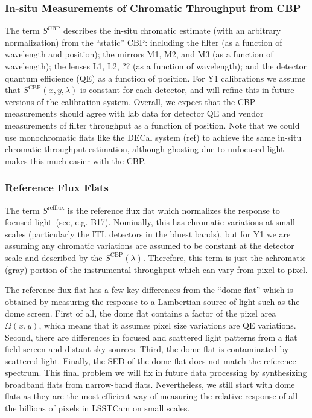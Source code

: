\documentclass[SE,authoryear,lsstdraft,toc]{lsstdoc}
\begin{document}
\subsubsection{In-situ Measurements of Chromatic Throughput from CBP}

The term $S^{\mathrm{CBP}}$ describes the in-situ chromatic estimate (with an
arbitrary normalization) from the ``static'' CBP: including the filter (as a
function of wavelength and position); the mirrors M1, M2, and M3 (as a function
of wavelength); the lenses L1, L2, ?? (as a function of wavelength); and the
detector quantum efficience (QE) as a function of position.  For Y1
calibrations we assume that $S^{\mathrm{CBP}}(x, y, \lambda)$ is constant for each
detector, and will refine this in future versions of the calibration system.
Overall, we expect that the CBP measurements should agree with lab data for
detector QE and vendor measurements of filter throughput as a function of
position.  Note that we could use monochromatic flats like the DECal system
(ref) to achieve the same in-situ chromatic throughput estimation, although
ghosting due to unfocused light makes this much easier with the CBP.

\subsubsection{Reference Flux Flats}
\label{sec:photom:reffluxflat}

The term $S^{\mathrm{refflux}}$ is the reference flux flat which normalizes the
response to focused light~(see, e.g. B17).  Nominally, this has chromatic
variations at small scales (particularly the ITL detectors in the bluest
bands), but for Y1 we are assuming any chromatic variations are assumed to be
constant at the detector scale and described by the
$S^{\mathrm{CBP}}(\lambda)$.  Therefore, this term is just the achromatic
(gray) portion of the instrumental throughput which can vary from pixel to
pixel.

The reference flux flat has a few key differences from the ``dome flat'' which
is obtained by measuring the response to a Lambertian source of light such as
the dome screen.  First of all, the dome flat contains a factor of the pixel
area $\Omega(x, y)$, which means that it assumes pixel size variations are QE
variations.  Second, there are differences in focused and scattered light
patterns from a flat field screen and distant sky sources.  Third, the dome
flat is contaminated by scattered light.  Finally, the SED of the dome flat
does not match the reference spectrum.  This final problem we will fix in
future data processing by synthesizing broadband flats from narrow-band flats.
Nevertheless, we still start with dome flats as they are the most efficient way
of measuring the relative response of all the billions of pixels in LSSTCam on
small scales.
\end{document}
